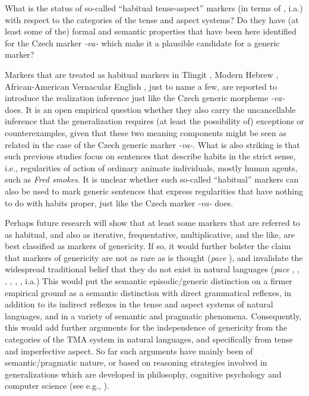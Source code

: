 \documentclass[output=paper,colorlinks,citecolor=brown]{langscibook}
\begin{document}
\eanoraggedright
What is the status of so-called ``habitual tense-aspect'' markers (in terms of \citealt{dahl1995}, i.a.)
with respect to the categories of the tense and aspect systems?
Do they have (at least some of the) formal and semantic properties that have been here identified
for the Czech marker \textit{-va-} which make it a plausible candidate for a generic marker?
\z

\noindent Markers that are treated as habitual markers in Tlingit \citep{cable2022}, Modern Hebrew \citep{bonehdoron2010}, African-American Vernacular English \citep{green2000aspectual}, just to name a few, are reported to introduce the realization inference just like
the Czech generic morpheme \textit{-va-} does. It is an open empirical question whether they also carry the uncancellable inference that the generalization requires (at least the possibility of)
exceptions or counterexamples, given that these two meaning components
might be seen as related in the case of the Czech  generic marker \textit{-va-}. What is also striking is that
such previous studies focus on sentences that describe habits in the strict sense, i.e., regularities of action of ordinary animate individuals, mostly human agents, such as \textit{Fred smokes}. It is unclear whether such so-called ``habitual'' markers can also be used to mark generic sentences that express regularities that
have nothing to do with habits proper, just
like the Czech marker \textit{-va-} does.

Perhaps future research will show that at least some
markers that are referred to as habitual, and also as iterative, frequentative, multiplicative, and the like, are best
classified as markers of genericity. If so, it
would further bolster the claim that markers of genericity are not as rare as is thought
(\textit{pace} \citealt{dahl1995}),
and invalidate the widespread traditional belief
that they do not exist in natural languages (\textit{pace}
\citealt{leslie2008}, \citealt{LeslieGelman2012}, \citealt{Johnston2012},  \citealt{Rhodes2018}, \citealt{cohen2022}, \citealt{Schiller2023}, i.a.)
This would put the semantic episodic/generic distinction on a firmer empirical ground as a semantic distinction with direct grammatical reflexes, in addition to its indirect reflexes in the tense and aspect systems of natural languages, and in a variety of semantic and
pragmatic phenomena.
Consequently, this would add further arguments for the independence  of genericity from
the categories of the TMA system in natural languages, and specifically from tense and imperfective aspect.
So far such arguments have mainly been of semantic/pragmatic nature, or based on reasoning strategies involved in generalizations which are developed in philosophy, cognitive psychology and computer science (see e.g., \citealt{carlson1977unified,carlson1982generic,krifka1995genericity,pelletier1997generics}).
\end{document}
